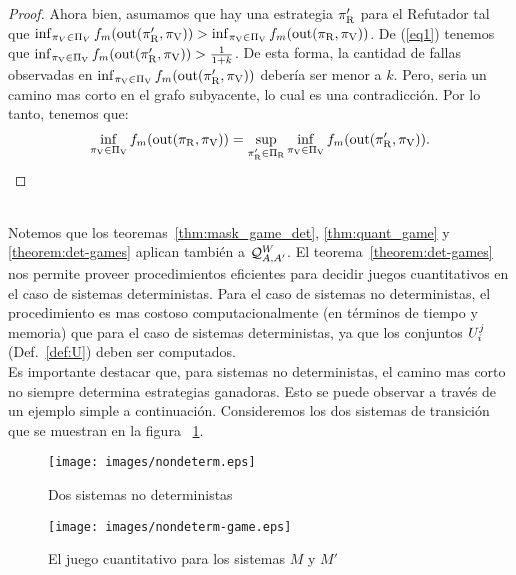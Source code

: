 \begin{proof}
Ahora bien, asumamos que hay una estrategia $\pi_{\mathrm{R}}'$ para el Refutador tal que 
$\inf_{\pi_V \in \Pi_V} f_m (\operatorname{out}(\pi_{\mathrm{R}}', \pi_{\mathrm{V}})) > \inf_{\pi_{\mathrm{V}} \in \Pi_{\mathrm{V}}} f_m (\operatorname{out}(\pi_{\mathrm{R}}, \pi_{\mathrm{V}}))$.
De (\ref{eq1}) tenemos que $\inf_{\pi_{\mathrm{V}} \in \Pi_{\mathrm{V}}} f_m(\operatorname{out}(\pi_{\mathrm{R}}', \pi_{\mathrm{V}})) > \frac{1}{1+k}$. 
De esta forma, la cantidad de fallas observadas en 
$\inf_{\pi_{\mathrm{V}} \in \Pi_{\mathrm{V}}} f_m(\operatorname{out}(\pi_{\mathrm{R}}', \pi_{\mathrm{V}}))$ debería ser menor a $k$. 
Pero, seria un camino mas corto en el grafo subyacente, lo cual es una contradicción. Por lo tanto, tenemos que:
\[	
	\inf_{\pi_{\mathrm{V}} \in \Pi_{\mathrm{V}}} f_m(\operatorname{out}(\pi_{\mathrm{R}}, \pi_{\mathrm{V}})) = \sup_{\pi_{\mathrm{R}}' \in \Pi_{\mathrm{R}}} \inf_{\pi_{\mathrm{V}} \in \Pi_{\mathrm{V}}} f_m( \operatorname{out}(\pi_{\mathrm{R}}',\pi_{\mathrm{V}})).
\]	
\qedhere
\end{proof} \\

	Notemos que los teoremas~\ref{thm:mask_game_det}, \ref{thm:quant_game} y \ref{theorem:det-games} aplican también a 
$\mathcal{Q}^W_{A,A'}$.
	El teorema~\ref{theorem:det-games} nos permite proveer procedimientos eficientes para decidir juegos cuantitativos en el caso de sistemas deterministas. Para el caso de sistemas no deterministas, el procedimiento es mas costoso computacionalmente (en términos de tiempo y memoria) que para el caso de sistemas deterministas, ya que los conjuntos $U^j_i$ (Def.~\ref{def:U}) deben ser computados. \\

Es importante destacar que, para sistemas no deterministas, el camino mas corto no siempre determina estrategias ganadoras. Esto se puede observar a través de un ejemplo simple a continuación. Consideremos los dos sistemas de transición que se muestran en la figura ~\ref{fig:two-nondet-systems}.

\begin{figure} [h]
\begin{center}
    \texttt{[image: images/nondeterm.eps]} 
    \caption{Dos sistemas no deterministas}
    \label{figure:nondeterm}\label{fig:two-nondet-systems}
\end{center}
\end{figure}
\begin{figure} [h]
\begin{center}
    \texttt{[image: images/nondeterm-game.eps]} 
    \caption{El juego cuantitativo para los sistemas $M$ y $M'$}
    \label{figure:nondeterm-game}
\end{center}
\end{figure}

